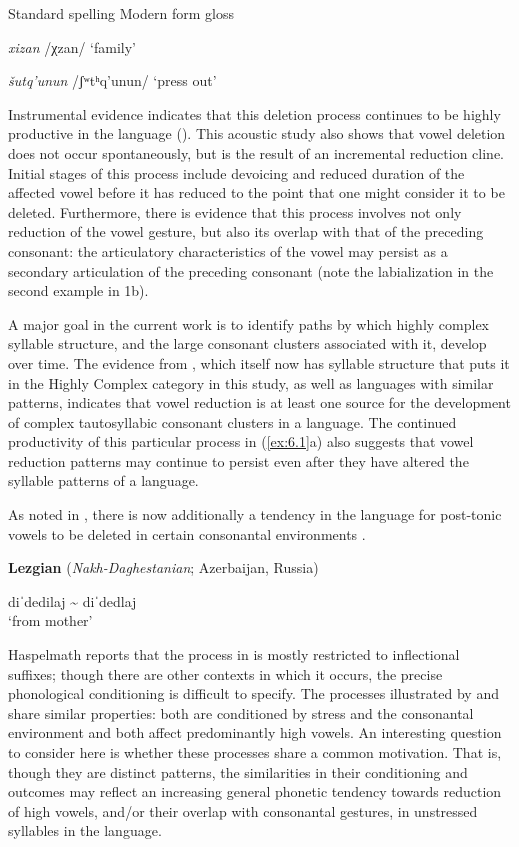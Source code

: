 \ex  Standard spelling  Modern form    gloss

\textit{xizan}      /χzan/      ‘family’

\textit{šutq’unun}    /ʃʷtʰq’unun/    ‘press out’
\citep[36-8]{Haspelmath1993}
\z
\z

  Instrumental evidence indicates that this deletion process continues to be highly productive in the language (\citealt{ChitoranBabaliyeva2007}). This acoustic study also shows that vowel deletion does not occur spontaneously, but is the result of an incremental reduction cline. Initial stages of this process include devoicing and reduced duration of the affected vowel before it has reduced to the point that one might consider it to be deleted. Furthermore, there is evidence that this process involves not only reduction of the vowel gesture, but also its overlap with that of the preceding consonant: the articulatory characteristics of the vowel may persist as a secondary articulation of the preceding consonant (note the labialization in the second example in 1b).

  A major goal in the current work is to identify paths by which highly complex syllable structure, and the large consonant clusters associated with it, develop over time. The evidence from , which itself now has syllable structure that puts it in the Highly Complex category in this study, as well as languages with similar patterns, indicates that vowel reduction is at least one source for the development of complex tautosyllabic consonant clusters in a language. The continued productivity of this particular process in  (\ref{ex:6.1}a) also suggests that vowel reduction patterns may continue to persist even after they have altered the syllable patterns of a language. 

  As noted in , there is now additionally a tendency in the language for post-tonic vowels to be deleted in certain consonantal environments .

\ea\label{ex:6.2}
  \textbf{Lezgian} (\textit{Nakh-Daghestanian}; Azerbaijan, Russia)

diˈdedilaj {\textasciitilde} diˈdedlaj\\
\glt ‘from mother’
\citep[40]{Haspelmath1993}
\z

Haspelmath reports that the process in  is mostly restricted to inflectional suffixes; though there are other contexts in which it occurs, the precise phonological conditioning is difficult to specify. The processes illustrated by  and  share similar properties: both are conditioned by stress and the consonantal environment and both affect predominantly high vowels. An interesting question to consider here is whether these processes share a common motivation. That is, though they are distinct patterns, the similarities in their conditioning and outcomes may reflect an increasing general phonetic tendency towards reduction of high vowels, and/or their overlap with consonantal gestures, in unstressed syllables in the language.

